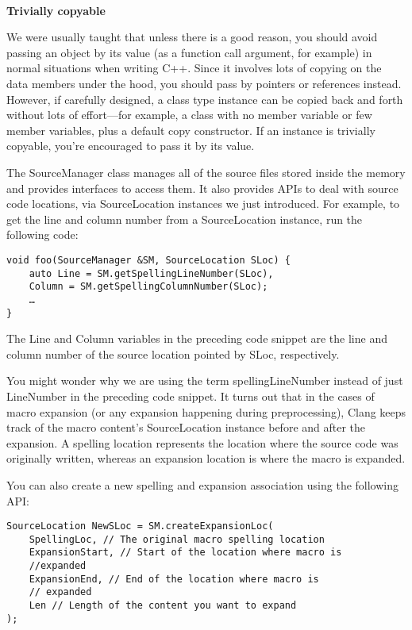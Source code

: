 \hspace*{\fill} \\ %
\noindent
\textbf{Trivially copyable}

We were usually taught that unless there is a good reason, you should avoid passing an object by its value (as a function call argument, for example) in normal situations when writing C++. Since it involves lots of copying on the data members under the hood, you should pass by pointers or references instead. However, if carefully designed, a class type instance can be copied back and forth without lots of effort—for example, a class with no member variable or few member variables, plus a default copy constructor. If an instance is trivially copyable, you're encouraged to pass it by its value.


The SourceManager class manages all of the source files stored inside the memory and provides interfaces to access them. It also provides APIs to deal with source code locations, via SourceLocation instances we just introduced. For example, to get the line and column number from a SourceLocation instance, run the following code:

\begin{lstlisting}[style=styleCXX]
void foo(SourceManager &SM, SourceLocation SLoc) {
	auto Line = SM.getSpellingLineNumber(SLoc),
	Column = SM.getSpellingColumnNumber(SLoc);
	…
}
\end{lstlisting}

The Line and Column variables in the preceding code snippet are the line and column number of the source location pointed by SLoc, respectively.

You might wonder why we are using the term spellingLineNumber instead of just LineNumber in the preceding code snippet. It turns out that in the cases of macro expansion (or any expansion happening during preprocessing), Clang keeps track of the macro content's SourceLocation instance before and after the expansion. A spelling location represents the location where the source code was originally written, whereas an expansion location is where the macro is expanded.

You can also create a new spelling and expansion association using the following API:

\begin{lstlisting}[style=styleCXX]
SourceLocation NewSLoc = SM.createExpansionLoc(
	SpellingLoc, // The original macro spelling location
	ExpansionStart, // Start of the location where macro is
	//expanded
	ExpansionEnd, // End of the location where macro is
	// expanded
	Len // Length of the content you want to expand
);
\end{lstlisting}

